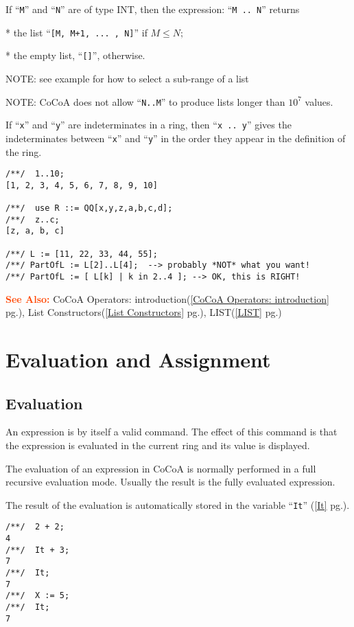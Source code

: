 \documentclass[a4paper]{mybook}
\newcommand\SeeAlso{\par\textcolor{OrangeRed}{\textbf{\large See Also: }}}
\begin{document}
        
If ``\verb&M&'' and ``\verb&N&'' are of type INT, then the expression:  ``\verb&M .. N&'' returns
\par 
      * the list ``\verb&[M, M+1, ... , N]&'' if $M \le  N;$
\par 
      * the empty list, ``\verb&[]&'', otherwise.
\par 
NOTE: see example for how to select a sub-range of a list
\par 
NOTE: CoCoA does not allow ``\verb&N..M&'' to produce lists longer than $10^7$ values.
\par 
If ``\verb&x&'' and ``\verb&y&'' are indeterminates in a ring, then ``\verb&x .. y&''
gives the indeterminates between ``\verb&x&'' and ``\verb&y&'' in the order they appear
in the definition of the ring.
\begin{Verbatim}[label=example, rulecolor=\color{PineGreen}, frame=single]
/**/  1..10;
[1, 2, 3, 4, 5, 6, 7, 8, 9, 10]

/**/  use R ::= QQ[x,y,z,a,b,c,d];
/**/  z..c;
[z, a, b, c]

/**/ L := [11, 22, 33, 44, 55];
/**/ PartOfL := L[2]..L[4];  --> probably *NOT* what you want!
/**/ PartOfL := [ L[k] | k in 2..4 ]; --> OK, this is RIGHT!
\end{Verbatim}


\SeeAlso %
  CoCoA Operators: introduction(\ref{CoCoA Operators: introduction} pg.\pageref{CoCoA Operators: introduction}), 
    List Constructors(\ref{List Constructors} pg.\pageref{List Constructors}), 
    LIST(\ref{LIST} pg.\pageref{LIST})

\chapter{Evaluation and Assignment}
\label{Evaluation and Assignment}

      

\section{Evaluation}
\label{Evaluation}

        
An expression is by itself a valid command. The effect of this
command is that the expression is evaluated in the current ring and
its value is displayed.
\par 
The evaluation of an expression in CoCoA is normally performed in a
full recursive evaluation mode.
Usually the result is the fully evaluated expression.
\par 
The result of the evaluation is automatically stored in the variable
``\verb&It&'' (\ref{It} pg.\pageref{It}).
\begin{Verbatim}[label=example, rulecolor=\color{PineGreen}, frame=single]
/**/  2 + 2;
4
/**/  It + 3;
7
/**/  It;
7
/**/  X := 5;
/**/  It;
7
\end{Verbatim}
\end{document}
